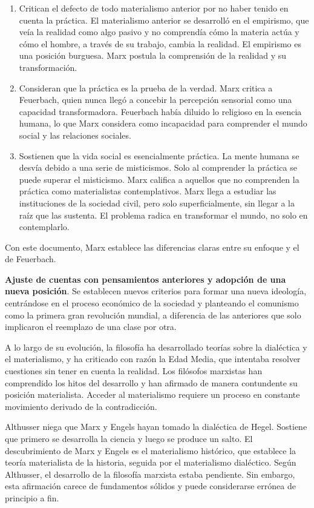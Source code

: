 \documentclass[
  a4paper,
]{article}
\begin{document}
\begin{enumerate}
\def\labelenumi{\arabic{enumi}.}
\item
  Critican el defecto de todo materialismo anterior por no haber tenido
  en cuenta la práctica. El materialismo anterior se desarrolló en el
  empirismo, que veía la realidad como algo pasivo y no comprendía cómo
  la materia actúa y cómo el hombre, a través de su trabajo, cambia la
  realidad. El empirismo es una posición burguesa. Marx postula la
  comprensión de la realidad y su transformación.
\item
  Consideran que la práctica es la prueba de la verdad. Marx critica a
  Feuerbach, quien nunca llegó a concebir la percepción sensorial como
  una capacidad transformadora. Feuerbach había diluido lo religioso en
  la esencia humana, lo que Marx considera como incapacidad para
  comprender el mundo social y las relaciones sociales.
\item
  Sostienen que la vida social es esencialmente práctica. La mente
  humana se desvía debido a una serie de misticismos. Solo al comprender
  la práctica se puede superar el misticismo. Marx califica a aquellos
  que no comprenden la práctica como materialistas contemplativos. Marx
  llega a estudiar las instituciones de la sociedad civil, pero solo
  superficialmente, sin llegar a la raíz que las sustenta. El problema
  radica en transformar el mundo, no solo en contemplarlo.
\end{enumerate}

Con este documento, Marx establece las diferencias claras entre su
enfoque y el de Feuerbach.

\textbf{Ajuste de cuentas con pensamientos anteriores y adopción de una
nueva posición}. Se establecen nuevos criterios para formar una nueva
ideología, centrándose en el proceso económico de la sociedad y
planteando el comunismo como la primera gran revolución mundial, a
diferencia de las anteriores que solo implicaron el reemplazo de una
clase por otra.

A lo largo de su evolución, la filosofía ha desarrollado teorías sobre
la dialéctica y el materialismo, y ha criticado con razón la Edad Media,
que intentaba resolver cuestiones sin tener en cuenta la realidad. Los
filósofos marxistas han comprendido los hitos del desarrollo y han
afirmado de manera contundente su posición materialista. Acceder al
materialismo requiere un proceso en constante movimiento derivado de la
contradicción.

Althusser niega que Marx y Engels hayan tomado la dialéctica de Hegel.
Sostiene que primero se desarrolla la ciencia y luego se produce un
salto. El descubrimiento de Marx y Engels es el materialismo histórico,
que establece la teoría materialista de la historia, seguida por el
materialismo dialéctico. Según Althusser, el desarrollo de la filosofía
marxista estaba pendiente. Sin embargo, esta afirmación carece de
fundamentos sólidos y puede considerarse errónea de principio a fin.
\end{document}
